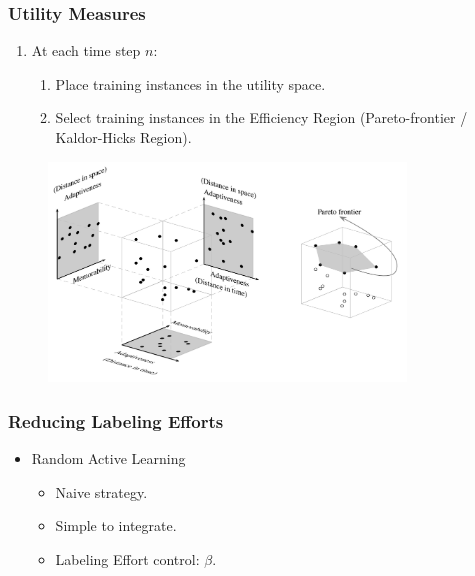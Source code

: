 \documentclass[14pt]{beamer}
\begin{document}
\begin{frame}\frametitle{Utility Measures}

\begin{enumerate}
\item At each time step $n$:
\begin{enumerate}
\item Place training instances in the utility space.
\item Select training instances in the Efficiency Region (Pareto-frontier / Kaldor-Hicks Region).
\end{enumerate}
\end{enumerate}

\vspace{-0.1in}
\begin{figure}
\centering
\includegraphics[height=2.30in]{pareto}
\end{figure}

\end{frame}

\begin{frame}\frametitle{Reducing Labeling Efforts}
\begin{itemize}
\item Random Active Learning
\begin{itemize}
\item Naive strategy.
\item Simple to integrate.
\item Labeling Effort control: $\beta$.
\end{itemize}
\end{itemize}
\end{frame}
\end{document}

